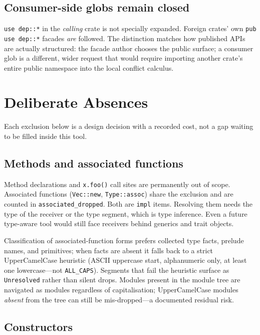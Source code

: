 \documentclass[11pt,a4paper,oneside]{report}
\begin{document}
\section{Consumer-side globs remain closed}

\texttt{use dep::*} in the \emph{calling} crate is not specially expanded.
Foreign crates' own \texttt{pub use dep::*} facades \emph{are} followed. The
distinction matches how published APIs are actually structured: the facade
author chooses the public surface; a consumer glob is a different, wider
request that would require importing another crate's entire public namespace
into the local conflict calculus.

\chapter{Deliberate Absences}
\label{ch:exclusions}

Each exclusion below is a design decision with a recorded cost, not a gap
waiting to be filled inside this tool.

\section{Methods and associated functions}

Method declarations and \texttt{x.foo()} call sites are permanently out of
scope. Associated functions (\texttt{Vec::new}, \texttt{Type::assoc}) share
the exclusion and are counted in \texttt{associated\_dropped}. Both are
\texttt{impl} items. Resolving them needs the type of the receiver or the
type segment, which is type inference. Even a future type-aware tool would
still face receivers behind generics and trait objects.

Classification of associated-function forms prefers collected type facts,
prelude names, and primitives; when facts are absent it falls back to a
strict UpperCamelCase heuristic (ASCII uppercase start, alphanumeric only,
at least one lowercase---not \texttt{ALL\_CAPS}). Segments that fail the
heuristic surface as \texttt{Unresolved} rather than silent drops. Modules
present in the module tree are navigated as modules regardless of
capitalisation; UpperCamelCase modules \emph{absent} from the tree can still
be mis-dropped---a documented residual risk.

\section{Constructors}
\end{document}
